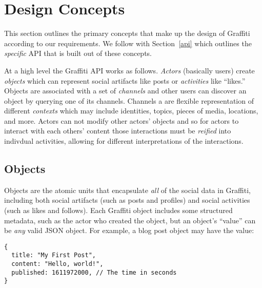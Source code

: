 \section{Design Concepts}
\label{concepts}

This section outlines the primary concepts that make up the design of Graffiti
according to our requirements.
We follow with Section~\ref{api} which outlines the \emph{specific} API that is built out of these
concepts.

At a high level the Graffiti API works as follows.
\emph{Actors} (basically users) create \emph{objects} which can represent
social artifacts like posts or \emph{activities} like ``likes.''
Objects are associated with a set of \emph{channels} and other users can
discover an object by querying one of its channels. Channels a are flexible representation
of different \emph{contexts} which may include identities, topics, pieces of media, locations,
and more.
Actors can not modify other actors' objects and so for actors to interact with each others' content
those interactions must be \emph{reified} into indivdual activities,
allowing for different interpretations of the interactions.


\subsection{Objects}
\label{concepts:objects}

Objects are the atomic units that encapsulate \emph{all}
of the social data in Graffiti, including
both social artifacts (such as posts and profiles) and social activities (such as likes and follows).
Each Graffiti object includes some structured metadata,
such as the actor who created the object,
but an object's ``value'' can be \emph{any} valid JSON object.
For example, a blog post object may have the value:

\begin{verbatim}
{
  title: "My First Post",
  content: "Hello, world!",
  published: 1611972000, // The time in seconds
}
\end{verbatim}

